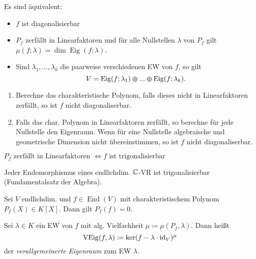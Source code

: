 \documentclass{cheat-sheet}
\DeclareMathOperator{\End}{End}
\DeclareMathOperator{\Eig}{Eig}
\DeclareMathOperator{\VEig}{VEig}
\begin{document}
\begin{satz}
  Es sind äquivalent:
  \begin{itemize}
    \item $f$ ist diagonalisierbar
    \item $P_f$ zerfällt in Linearfaktoren und für alle Nullstellen $\lambda$ von $P_f$ gilt $\mu(f; \lambda) = \dim \Eig(f; \lambda)$.
    \item Sind $\lambda_1, ..., \lambda_k$ die paarweise verschiedenen EW von $f$, so gilt
    \[ V = \Eig(f; \lambda_1) \varoplus ... \varoplus \Eig(f; \lambda_k). \]
  \end{itemize}
\end{satz}

\begin{verf}
  \begin{enumerate}
    \item Berechne das charakteristische Polynom, falls dieses nicht in Linearfaktoren zerfällt, so ist $f$ nicht diagonaliserbar.
    \item Falls das char. Polynom in Linearfaktoren zerfällt, so berechne für jede Nullstelle den Eigenraum. Wenn für eine Nullstelle algebraische und geometrische Dimension nicht übereinstimmen, so ist $f$ nicht diagonaliserbar.
  \end{enumerate}
\end{verf}

\begin{satz}
  $P_f \text{ zerfällt in Linearfaktoren } \iff f \text{ ist trigonalisierbar }$
\end{satz}


\begin{kor}
  Jeder Endomorphismus eines endlichdim. $\mathbb{C}$-VR ist trigonalisierbar (Fundamentalsatz der Algebra).
\end{kor}


\begin{satz}
  Sei $V$ endlichdim. und $f \in \End(V)$ mit charakteristischem Polynom $P_f(X) \in K[X]$. Dann gilt $P_f(f) = 0$.
\end{satz}

\begin{defn}
  Sei $\lambda \in K$ ein EW von $f$ mit alg. Vielfachheit $\mu \coloneqq \mu(P_f, \lambda)$. Dann heißt
  \[ \VEig(f, \lambda) \coloneqq \ker(f - \lambda \cdot \id_V)^{\mu} \]
  der \emph{verallgemeinerte Eigenraum} zum EW $\lambda$.
\end{defn}
\end{document}
